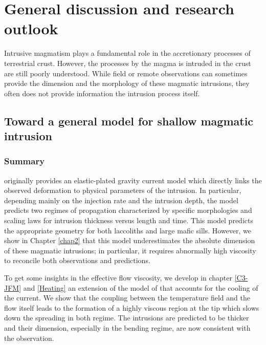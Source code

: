 
\chapter{General discussion and research outlook}
\label{chap9}
\minitoc

Intrusive  magmatism  plays a  fundamental  role  in the  accretionary
processes of terrestrial crust.
 However, the processes by the magma is
intruded in  the crust  are still poorly  understood.  While  field or
remote  observations  can  sometimes  provide the  dimension  and  the
morphology of these  magmatic intrusions, they often  does not provide
information the intrusion process itself.



\section{Toward a general model for shallow magmatic intrusion}
\label{sec:toward-general-model}

\subsection{Summary}
\label{sec:summary}

\citet{Michaut:2011kg} originally  provides an  elastic-plated gravity
current  model  which  directly  links  the  observed  deformation  to
physical parameters of the  intrusion. In particular, depending mainly
on the injection rate and the  intrusion depth, the model predicts two
regimes  of propagation  characterized  by  specific morphologies  and
scaling laws  for intrusion  thickness versus  length and  time.  This
model predicts the appropriate geometry  for both laccoliths and large
mafic sills.  However, we show  in Chapter \ref{chap2} that this model
underestimates the absolute dimension of these magmatic intrusions; in
particular, it  requires abnormally  high viscosity to  reconcile both
observations and predictions.

To get  some insights in the  effective flow viscosity, we  develop in
chapter \ref{C3-JFM}  and \ref{Heating} an  extension of the  model of
\citet{Michaut:2011kg} that  accounts for the cooling  of the current.
We show that  the coupling between the temperature field  and the flow
itself leads  to the formation of  a highly viscous region  at the tip
which slows  down the  spreading in both  regime.  The  intrusions are
predicted to be thicker and their dimension, especially in the bending
regime, are now consistent with the observation.

